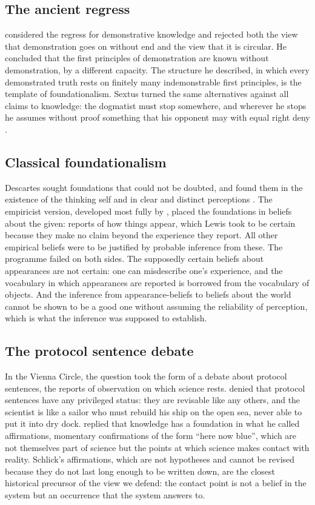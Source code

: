 \documentclass{situationist-preprint}
\begin{document}
\subsection{The ancient regress}

\citet[I.3]{AristotlePostAn} considered the regress for demonstrative knowledge and rejected both the view that demonstration goes on without end and the view that it is circular. He concluded that the first principles of demonstration are known without demonstration, by a different capacity. The structure he described, in which every demonstrated truth rests on finitely many indemonstrable first principles, is the template of foundationalism. Sextus turned the same alternatives against all claims to knowledge: the dogmatist must stop somewhere, and wherever he stops he assumes without proof something that his opponent may with equal right deny \citep[I.164--177]{Sextus}.

\subsection{Classical foundationalism}

Descartes sought foundations that could not be doubted, and found them in the existence of the thinking self and in clear and distinct perceptions \citep{Descartes1641}. The empiricist version, developed most fully by \citet{CILewis1946}, placed the foundations in beliefs about the given: reports of how things appear, which Lewis took to be certain because they make no claim beyond the experience they report. All other empirical beliefs were to be justified by probable inference from these. The programme failed on both sides. The supposedly certain beliefs about appearances are not certain: one can misdescribe one's experience, and the vocabulary in which appearances are reported is borrowed from the vocabulary of objects. And the inference from appearance-beliefs to beliefs about the world cannot be shown to be a good one without assuming the reliability of perception, which is what the inference was supposed to establish.

\subsection{The protocol sentence debate}

In the Vienna Circle, the question took the form of a debate about protocol sentences, the reports of observation on which science rests. \citet{Neurath1932} denied that protocol sentences have any privileged status: they are revisable like any others, and the scientist is like a sailor who must rebuild his ship on the open sea, never able to put it into dry dock. \citet{Schlick1934} replied that knowledge has a foundation in what he called affirmations, momentary confirmations of the form \enquote{here now blue}, which are not themselves part of science but the points at which science makes contact with reality. Schlick's affirmations, which are not hypotheses and cannot be revised because they do not last long enough to be written down, are the closest historical precursor of the view we defend: the contact point is not a belief in the system but an occurrence that the system answers to.
\end{document}
